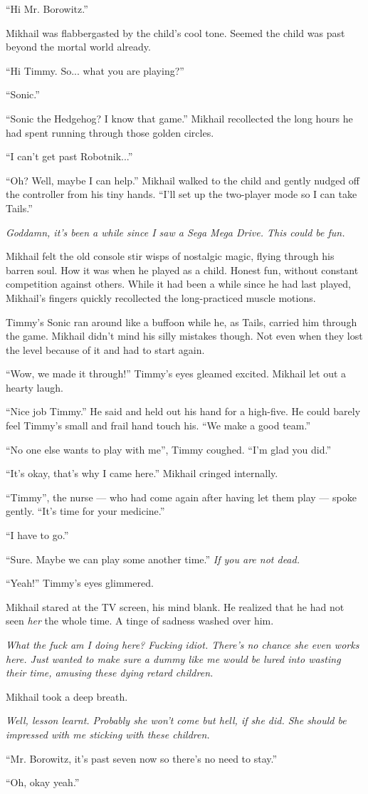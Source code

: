 “Hi Mr. Borowitz.”

Mikhail was flabbergasted by the child’s cool tone. Seemed the child was past beyond the mortal world already.

“Hi Timmy. So... what you are playing?”

“Sonic.”

“Sonic the Hedgehog? I know that game.” Mikhail recollected the long hours he had spent running through those golden circles.

“I can’t get past Robotnik...”

“Oh? Well, maybe I can help.” Mikhail walked to the child and gently nudged off the controller from his tiny hands. “I’ll set up the two-player mode so I can take Tails.”

\textit{Goddamn, it’s been a while since I saw a Sega Mega Drive. This could be fun. }

Mikhail felt the old console stir wisps of nostalgic magic, flying through his barren soul. How it was when he played as a child. Honest fun, without constant competition against others. While it had been a while since he had last played, Mikhail’s fingers quickly recollected the long-practiced muscle motions. 

Timmy’s Sonic ran around like a buffoon while he, as Tails, carried him through the game. Mikhail didn’t mind his silly mistakes though. Not even when they lost the level because of it and had to start again.

“Wow, we made it through!” Timmy’s eyes gleamed excited. Mikhail let out a hearty laugh.

“Nice job Timmy.” He said and held out his hand for a high-five. He could barely feel Timmy’s small and frail hand touch his. “We make a good team.”

“No one else wants to play with me”, Timmy coughed. “I’m glad you did.”

“It’s okay, that’s why I came here.” Mikhail cringed internally.

“Timmy”, the nurse — who had come again after having let them play — spoke gently. “It’s time for your medicine.”

“I have to go.”

“Sure. Maybe we can play some another time.” \textit{If you are not dead.}

“Yeah!” Timmy’s eyes glimmered.

Mikhail stared at the TV screen, his mind blank. He realized that he had not seen \textit{her} the whole time. A tinge of sadness washed over him.

\textit{What the fuck am I doing here? Fucking idiot. There’s no chance she even works here. Just wanted to make sure a dummy like me would be lured into wasting their time, amusing these dying retard children.}

Mikhail took a deep breath.

\textit{Well, lesson learnt. Probably she won’t come but hell, if she did. She should be impressed with me sticking with these children. }

“Mr. Borowitz, it’s past seven now so there’s no need to stay.”

“Oh, okay yeah.”
